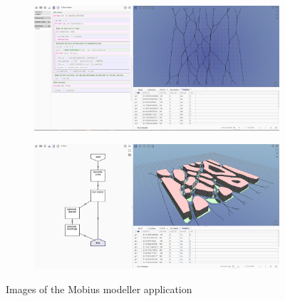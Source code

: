 \begin{figure}
  \centering
  \begin{subfigure}[b]{0.45\linewidth}
    \graphicspath{{../../assets/images/background/geo-web-vpl/}}
    \centering
    \includegraphics[width=\linewidth]{mobius-3.png}
    \caption{}
  \end{subfigure}%
  \qquad %
  \begin{subfigure}[b]{0.45\linewidth}
    \graphicspath{{../../assets/images/background/geo-web-vpl/}}
    \centering
    \includegraphics[width=\linewidth]{mobius-4.png}
    \caption{}
  \end{subfigure}%
  \caption[Mobius Modeller]{Images of the Mobius modeller application \citep{janssen_mobius_2021}}%
  \label{fig:mobiusmodeller}
  \end{figure}





